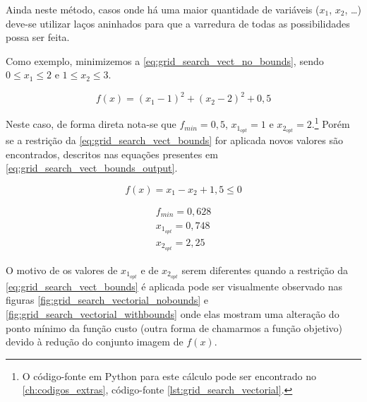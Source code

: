 Ainda neste método, casos onde há uma maior quantidade de variáveis ($x_1$, $x_2$, \dots)
deve-se utilizar laços aninhados para que a varredura de todas as possibilidades
possa ser feita. 

Como exemplo, minimizemos a \cref{eq:grid_search_vect_no_bounds}, sendo
$0 \leq x_1 \leq 2$ e $1 \leq x_2 \leq 3$.

\begin{equation}
	\label{eq:grid_search_vect_no_bounds}
	f(x) = (x_1 - 1)^2 + (x_2 - 2)^2 + 0,5
\end{equation}

Neste caso, de forma direta nota-se que
$f_{min} = 0,5$, $x_{1_{opt}} = 1$ e $x_{2_{opt}} = 2$.\footnote{
	O código-fonte em Python para este cálculo pode ser encontrado no							%
	\cref{ch:codigos_extras}, código-fonte \ref{lst:grid_search_vectorial}.}					%
Porém se a restrição da \cref{eq:grid_search_vect_bounds} for aplicada
novos valores são encontrados, descritos nas equações presentes em
\cref{eq:grid_search_vect_bounds_output}.

\begin{equation}
	\label{eq:grid_search_vect_bounds}
	f(x) = x_1 - x_2 + 1,5 \leq 0
\end{equation}


\begin{equation}
	\label{eq:grid_search_vect_bounds_output}
	\begin{aligned}
		f_{min} = 0,628 \\
		x_{1_{opt}} = 0,748 \\
		x_{2_{opt}} = 2,25
	\end{aligned}
\end{equation}

O motivo de os valores de $x_{1_{opt}}$ e de $x_{2_{opt}}$ serem diferentes quando a restrição
da \cref{eq:grid_search_vect_bounds} é aplicada pode ser visualmente observado nas figuras
\ref{fig:grid_search_vectorial_nobounds} e \ref{fig:grid_search_vectorial_withbounds} onde
elas mostram uma alteração do ponto mínimo da função custo (outra forma de chamarmos a função
objetivo) devido à redução do conjunto imagem de $f(x)$.


